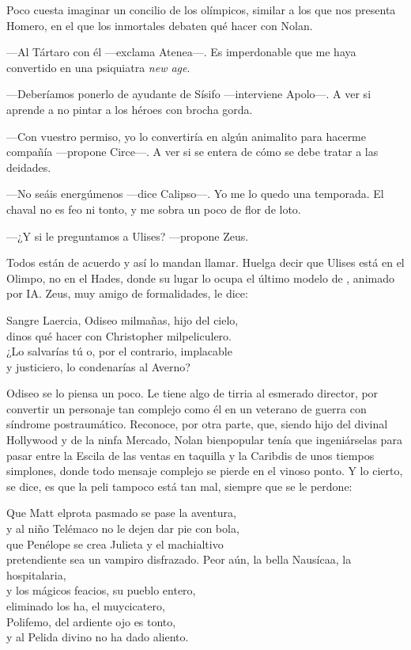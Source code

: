 \label{cap:sirenas}

Poco cuesta imaginar un concilio de los olímpicos, similar a los que nos presenta Homero, en el que los inmortales debaten qué hacer con Nolan.

---Al Tártaro con él ---exclama Atenea---. Es imperdonable que me haya convertido en una psiquiatra \emph{new age}.

---Deberíamos ponerlo de ayudante de Sísifo ---interviene Apolo---. A ver si aprende a no pintar a los héroes con brocha gorda.

---Con vuestro permiso, yo lo convertiría en algún animalito para hacerme compañía ---propone Circe---. A ver si se entera de cómo se debe tratar a las deidades.

---No seáis energúmenos ---dice Calipso---. Yo me lo quedo una temporada. El chaval no es feo ni tonto, y me sobra un poco de flor de loto.

---¿Y si le preguntamos a Ulises? ---propone Zeus.

Todos están de acuerdo y así lo mandan llamar. Huelga decir que Ulises está en el Olimpo, no en el Hades, donde su lugar lo ocupa el último modelo de , animado por IA. Zeus, muy amigo de formalidades, le dice:

\begin{versocita}
Sangre Laercia, Odiseo milmañas, hijo del cielo,\\
dinos qué hacer con Christopher milpeliculero.\\
¿Lo salvarías tú o, por el contrario, implacable\\
y justiciero, lo condenarías al Averno?
\end{versocita}

Odiseo se lo piensa un poco. Le tiene algo de tirria al esmerado director, por convertir un personaje tan complejo como él en un veterano de guerra con síndrome postraumático. Reconoce, por otra parte, que, siendo hijo del divinal Hollywood y de la ninfa Mercado, Nolan bienpopular tenía que ingeniárselas para pasar entre la Escila de las ventas en taquilla y la Caribdis de unos tiempos simplones, donde todo mensaje complejo se pierde en el vinoso ponto. Y lo cierto, se dice, es que la peli tampoco está tan mal, siempre que se le perdone:

\begin{versopropio}
Que Matt elprota pasmado se pase la aventura,\\
y al niño Telémaco no le dejen dar pie con bola,\\
que Penélope se crea Julieta y el machialtivo\\
pretendiente sea un vampiro disfrazado.
\stanzabreak
Peor aún, la bella Nausícaa, la hospitalaria,\\
y los mágicos feacios, su pueblo entero,\\
eliminado los ha, el muycicatero,\\
Polifemo, del ardiente ojo es tonto,\\
y al Pelida divino no ha dado aliento.
\end{versopropio}

